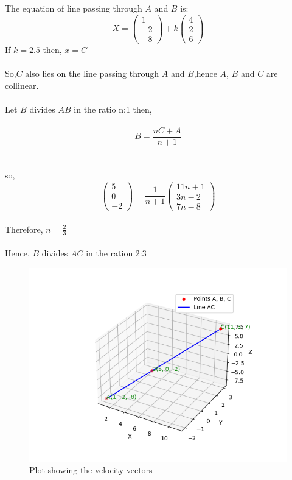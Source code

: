 \documentclass[journal]{IEEEtran}
\begin{document}
The equation of line passing through $A$ and $B$ is:\\
\begin{equation}
    X = \begin{pmatrix}
        1\\
        -2\\
        -8
    \end{pmatrix}+k\begin{pmatrix}
        4\\
        2\\
        6
    \end{pmatrix}
\end{equation}
If $k=2.5$ then, $x=C$\\
\\
So,$C$ also lies on the line passing through $A$ and $B$,hence $A$, $B$ and $C$ are collinear.\\
\\
Let $B$ divides $AB$ in the ratio n:1 then,\\
\\
\begin{equation}
    B = \frac{nC+A}{n+1}
\end{equation}\\
\\
so,\\
\begin{equation}
    \begin{pmatrix}
        5\\
        0\\
        -2
    \end{pmatrix}=\frac{1}{n+1}\begin{pmatrix}
        11n+1\\
        3n-2\\
        7n-8
    \end{pmatrix}
\end{equation}\\
Therefore, $n = \frac{2}{3}$\\
\\
Hence, $B$ divides $AC$ in the ration 2:3
  \begin{figure}[h!]
    \centering
    \includegraphics[width=0.7\linewidth]{figs/figure1.png}
    \caption{Plot showing the velocity vectors}
    \label{stemplot}
 \end{figure}
\end{document}
